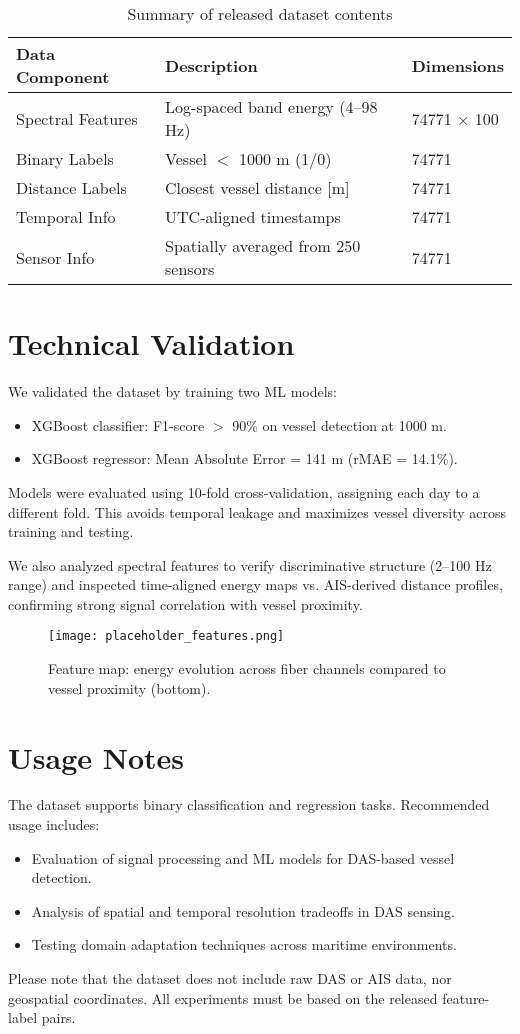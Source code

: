 \documentclass[11pt]{article}
\begin{document}
\begin{table}[H]
  \centering
  \caption{Summary of released dataset contents}
  \begin{tabular}{@{}lll@{}} \toprule
  Data Component & Description & Dimensions \\ \midrule
  Spectral Features & Log-spaced band energy (4–98 Hz) & 74771 $\times$ 100 \\
  Binary Labels & Vessel $\lt$ 1000 m (1/0) & 74771 \\
  Distance Labels & Closest vessel distance [m] & 74771 \\
  Temporal Info & UTC-aligned timestamps & 74771 \\
  Sensor Info & Spatially averaged from 250 sensors & 74771 \\
  \bottomrule
  \end{tabular}
\end{table}

\section*{Technical Validation}
We validated the dataset by training two ML models:
\begin{itemize}
  \item XGBoost classifier: F1-score $>$ 90\% on vessel detection at 1000 m.
  \item XGBoost regressor: Mean Absolute Error = 141 m (rMAE = 14.1\%).
\end{itemize}

Models were evaluated using 10-fold cross-validation, assigning each day to a different fold. This avoids temporal leakage and maximizes vessel diversity across training and testing.

We also analyzed spectral features to verify discriminative structure (2–100 Hz range) and inspected time-aligned energy maps vs. AIS-derived distance profiles, confirming strong signal correlation with vessel proximity.

\begin{figure}[H]
  \centering
  \texttt{[image: placeholder\_features.png]}
  \caption{Feature map: energy evolution across fiber channels compared to vessel proximity (bottom).}
\end{figure}

\section*{Usage Notes}
The dataset supports binary classification and regression tasks. Recommended usage includes:
\begin{itemize}
  \item Evaluation of signal processing and ML models for DAS-based vessel detection.
  \item Analysis of spatial and temporal resolution tradeoffs in DAS sensing.
  \item Testing domain adaptation techniques across maritime environments.
\end{itemize}
Please note that the dataset does not include raw DAS or AIS data, nor geospatial coordinates. All experiments must be based on the released feature-label pairs.
\end{document}
